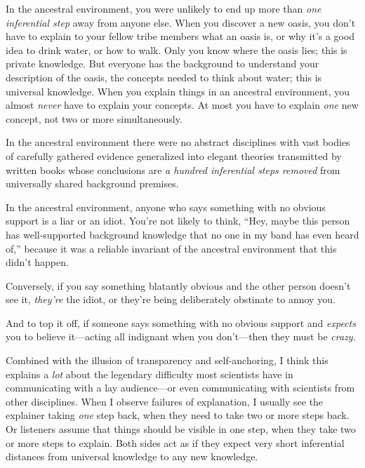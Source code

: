{
 In the ancestral environment, you were unlikely to end up more
than \textit{one inferential step} away from anyone else. When you
discover a new oasis, you don't have to explain to your
fellow tribe members what an oasis is, or why it's a
good idea to drink water, or how to walk. Only you know where the oasis
lies; this is private knowledge. But everyone has the background to
understand your description of the oasis, the concepts needed to think
about water; this is universal knowledge. When you explain things in an
ancestral environment, you almost \textit{never} have to explain your
concepts. At most you have to explain \textit{one} new concept, not two
or more simultaneously.}

{
 In the ancestral environment there were no abstract disciplines
with vast bodies of carefully gathered evidence generalized into
elegant theories transmitted by written books whose conclusions are
\textit{a hundred inferential steps removed} from universally shared
background premises.}

{
 In the ancestral environment, anyone who says something with no
obvious support is a liar or an idiot. You're not
likely to think, ``Hey, maybe this person has
well-supported background knowledge that no one in my band has even
heard of,'' because it was a reliable invariant of
the ancestral environment that this didn't happen.}

{
 Conversely, if you say something blatantly obvious and the other
person doesn't see it, \textit{they're}
the idiot, or they're being deliberately obstinate to
annoy you.}

{
 And to top it off, if someone says something with no obvious
support and \textit{expects} you to believe it---acting all indignant
when you don't---then they must be \textit{crazy.}}

{
 Combined with the illusion of transparency and self-anchoring, I
think this explains a \textit{lot} about the legendary difficulty most
scientists have in communicating with a lay audience---or even
communicating with scientists from other disciplines. When I observe
failures of explanation, I usually see the explainer taking
\textit{one} step back, when they need to take two or more steps back.
Or listeners assume that things should be visible in one step, when
they take two or more steps to explain. Both sides act as if they
expect very short inferential distances from universal knowledge to any
new knowledge.}

